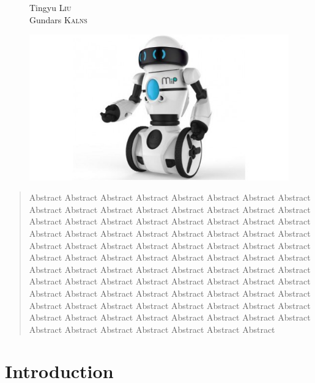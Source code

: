 \documentclass[a4paper,11pt]{article}
\begin{document}
\begin{titlepage}
\begin{figure}[h]
\begin{minipage}[b]{0.3\linewidth}
\begin{flushleft}
{Tingyu \textsc{Liu} \\
Gundars \textsc{Kalns}
}
\end{flushleft}
\end{minipage}
\qquad
\quad
\begin{minipage}[b]{0.62\linewidth}
                \includegraphics[width=\linewidth]{figures/robot.jpg}
\end{minipage}
\end{figure}
\vspace{1cm}
\thispagestyle{empty}
\begin{abstract}
Abstract Abstract Abstract Abstract Abstract Abstract Abstract Abstract Abstract Abstract Abstract Abstract Abstract Abstract Abstract Abstract Abstract Abstract Abstract Abstract Abstract Abstract Abstract Abstract Abstract  Abstract Abstract Abstract Abstract Abstract Abstract Abstract Abstract Abstract Abstract Abstract Abstract Abstract Abstract Abstract Abstract Abstract Abstract Abstract Abstract Abstract Abstract Abstract Abstract Abstract Abstract Abstract Abstract Abstract Abstract Abstract Abstract Abstract Abstract Abstract Abstract Abstract Abstract Abstract Abstract Abstract Abstract Abstract Abstract Abstract Abstract Abstract Abstract Abstract Abstract Abstract Abstract Abstract Abstract Abstract Abstract Abstract Abstract Abstract Abstract Abstract Abstract Abstract Abstract Abstract Abstract Abstract Abstract Abstract Abstract 
\end{abstract}
\end{titlepage}


\tableofcontents
\newpage

\section{Introduction\label{sec:Introduction}}

\end{document}

